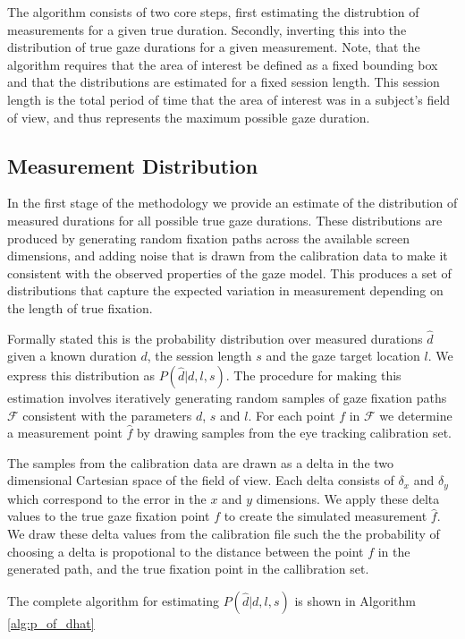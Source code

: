 \documentclass[12pt,a4paper]{article}
\numberwithin{equation}{section}
\begin{document}
The algorithm consists of two core steps, first estimating the distrubtion of measurements
for a given true duration. Secondly, inverting this into the distribution of true
gaze durations for a given measurement. Note, that the algorithm requires that the area of
interest be defined as a fixed bounding box and that the distributions are estimated for
a fixed session length. This session length is the total period of time that the area of
interest was in a subject's field of view, and thus represents the maximum possible gaze
duration.

\subsection{Measurement Distribution}

In the first stage of the methodology we provide an estimate of the distribution of measured
durations for all possible true gaze durations. These distributions are produced by generating
random fixation paths across the available screen dimensions, and adding noise that is 
drawn from the calibration data to make it consistent with the observed properties of the gaze model.
This produces a set of distributions that capture the expected
variation in measurement depending on the length of true fixation.

Formally stated this is the probability distribution over measured durations $\hat{d}$ given a
known duration $d$, the session length $s$ and the gaze target location $l$. 
We express this distribution as $P(\hat{d}|d,l,s)$. The
procedure for making this estimation involves iteratively generating random samples
of gaze fixation paths $\mathcal{F}$ consistent with the parameters $d$, $s$ and $l$. 
For each point $f$ in $\mathcal{F}$ we determine a measurement point $\hat{f}$ 
by drawing samples from the eye tracking calibration set.
 
The samples from the calibration data are drawn as a delta in the two dimensional Cartesian
space of the field of view. Each delta consists of $\delta_x$ and $\delta_y$ which correspond
to the error in the $x$ and $y$ dimensions. We apply these delta values to the true gaze 
fixation point $f$ to create the simulated measurement $\hat{f}$.
We draw these delta values from the calibration file such the
the probability of choosing a delta is propotional to the distance between the point $f$
in the generated path, and the true fixation point in the callibration set. 

The complete algorithm for estimating $P(\hat{d}|d,l,s)$ is shown in Algorithm \ref{alg:p_of_dhat}    
\end{document}
